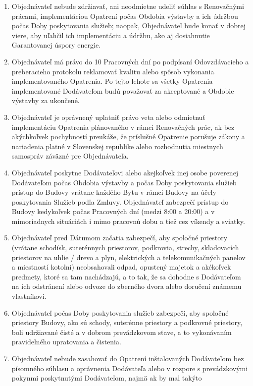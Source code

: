\begin{multicols}{2}
\begin{enumerate}
\item
  Objednávateľ nebude zdržiavať, ani neodmietne udeliť súhlas s
  Renovačnými prácami, implementáciou Opatrení počas Obdobia výstavby a
  ich údržbou počas Doby poskytovania služieb; naopak, Objednávateľ bude
  konať v dobrej viere, aby uľahčil ich implementáciu a údržbu, ako aj
  dosiahnutie Garantovanej úspory energie.
\item
  Objednávateľ má právo do 10 Pracovných dní po podpísaní Odovzdávacieho
  a preberacieho protokolu reklamovať kvalitu alebo spôsob vykonania
  implementovaného Opatrenia. Po tejto lehote sa všetky Opatrenia
  implementované Dodávateľom budú považovať za akceptované a Obdobie
  výstavby za ukončené.
\item
  Objednávateľ je oprávnený uplatniť právo veta alebo odmietnuť
  implementáciu Opatrenia plánovaného v rámci Renovačných prác, ak bez
  akýchkoľvek pochybností preukáže, že príslušné Opatrenie porušuje
  zákony a nariadenia platné v Slovenskej republike alebo rozhodnutia
  miestnych samospráv záväzné pre Objednávateľa.
\item
  Objednávateľ poskytne Dodávateľovi alebo akejkoľvek inej osobe
  poverenej Dodávateľom počas Obdobia výstavby a počas Doby poskytovania
  služieb prístup do Budovy vrátane každého Bytu v rámci Budovy na účely
  poskytovania Služieb podľa Zmluvy. Objednávateľ zabezpečí prístup do
  Budovy kedykoľvek počas Pracovných dní (medzi 8:00 a 20:00) a v
  mimoriadnych situáciách i mimo pracovnú dobu a tiež cez víkendy a
  sviatky.
\item
  Objednávateľ pred Dátumom začatia zabezpečí, aby spoločné priestory
  (vrátane schodísk, suterénnych priestorov, podkrovia, strechy,
  skladovacích priestorov na uhlie / drevo a plyn, elektrických a
  telekomunikačných panelov a miestností kotolní) neobsahovali odpad,
  opustený majetok a akékoľvek predmety, ktoré sa tam nachádzajú, a to
  tak, že sa dohodne s Dodávateľom na ich odstránení alebo odvoze do
  zberného dvora alebo doručení známemu vlastníkovi.
\item
  Objednávateľ počas Doby poskytovania služieb zabezpečí, aby spoločné
  priestory Budovy, ako sú schody, suterénne priestory a podkrovné
  priestory, boli udržiavané čisté a v dobrom prevádzkovom stave, a to
  vykonávaním pravidelného upratovania a čistenia.
\item
  Objednávateľ nebude zasahovať do Opatrení inštalovaných Dodávateľom
  bez písomného súhlasu a oprávnenia Dodávateľa alebo v rozpore s
  prevádzkovými pokynmi poskytnutými Dodávateľom, najmä ak by mal takýto

\end{enumerate}
\end{multicols}
